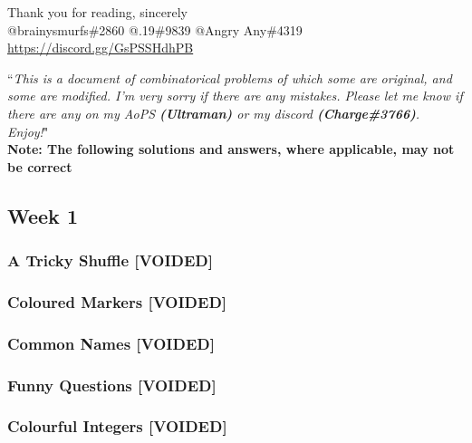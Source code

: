 \documentclass[titlepage=true]{scrartcl}
\begin{document}
Thank you for reading, sincerely \\

@brainysmurfs\#2860  @.19\#9839 @Angry Any\#4319 \\

\url{https://discord.gg/GsPSSHdhPB}

\newpage 

``\emph{This is a document of combinatorical problems of which some are original, and some are modified. I'm very sorry if there are any mistakes. Please let me know if there are any on my AoPS \textbf{(Ultraman)} or my discord \textbf{(Charge\#3766)}. Enjoy!}"\\

\textbf{Note: The following solutions and answers, where applicable, may not be correct}
        
    \subsection{Week 1}
        
        \subsubsection{A Tricky Shuffle \textbf[VOIDED]}
            \label{4-1-1}
            
        \newpage 
        
        \subsubsection{Coloured Markers \textbf[VOIDED]}
            \label{4-1-2}
            
        \newpage 

        \subsubsection{Common Names \textbf[VOIDED]}
            \label{4-1-3}
            
        \newpage 

        \subsubsection{Funny Questions \textbf[VOIDED]}
            \label{4-1-4}
            
        \newpage 

        \subsubsection{Colourful Integers \textbf[VOIDED]}
            \label{4-1-5}
            
        \newpage 
\end{document}
